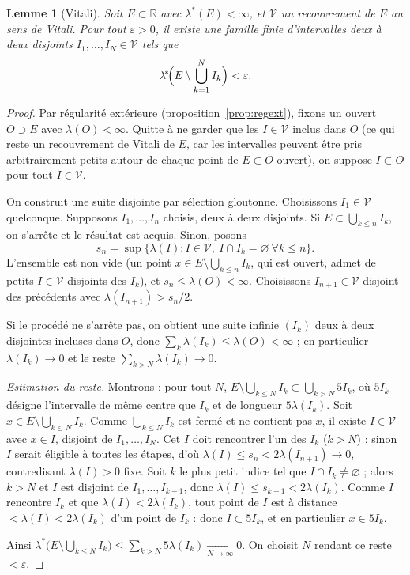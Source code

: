 \documentclass[11pt]{article}
\theoremstyle{thmblue}
\newtheorem{lemme}[theoreme]{Lemme}
\theoremstyle{defplain}
\theoremstyle{rem}
\newcommand{\R}{\mathbb{R}}
\newcommand{\eps}{\varepsilon}
\newcommand{\lstar}{\lambda^{\!*}}
\begin{document}
\begin{lemme}[Vitali]\label{lem:vitali}
Soit $E\subset\R$ avec $\lstar(E)<\infty$, et $\mathcal V$ un recouvrement de $E$ au sens de Vitali.
Pour tout $\eps>0$, il existe une famille \emph{finie} d'intervalles \emph{deux à deux disjoints}
$I_1,\dots,I_N\in\mathcal V$ tels que
\[
\lstar\!\Bigl(E\setminus\bigcup_{k=1}^{N} I_k\Bigr)<\eps.
\]
\end{lemme}

\begin{proof}
Par régularité extérieure (proposition~\ref{prop:regext}), fixons un ouvert $O\supset E$ avec $\lambda(O)<\infty$. Quitte à ne garder
que les $I\in\mathcal V$ inclus dans $O$ (ce qui reste un recouvrement de Vitali de $E$, car les
intervalles peuvent être pris arbitrairement petits autour de chaque point de $E\subset O$ ouvert),
on suppose $I\subset O$ pour tout $I\in\mathcal V$.

On construit une suite disjointe par sélection gloutonne. Choisissons $I_1\in\mathcal V$ quelconque.
Supposons $I_1,\dots,I_n$ choisis, deux à deux disjoints. Si $E\subset\bigcup_{k\le n}I_k$, on
s'arrête et le résultat est acquis. Sinon, posons
\[
s_n=\sup\{\lambda(I):I\in\mathcal V,\ I\cap I_k=\varnothing\ \forall k\le n\}.
\]
L'ensemble est non vide (un point $x\in E\setminus\bigcup_{k\le n}I_k$, qui est ouvert, admet de
petits $I\in\mathcal V$ disjoints des $I_k$), et $s_n\le\lambda(O)<\infty$. Choisissons
$I_{n+1}\in\mathcal V$ disjoint des précédents avec $\lambda(I_{n+1})>s_n/2$.

Si le procédé ne s'arrête pas, on obtient une suite infinie $(I_k)$ deux à deux disjointes incluses
dans $O$, donc $\sum_k\lambda(I_k)\le\lambda(O)<\infty$ ; en particulier $\lambda(I_k)\to0$ et le
reste $\sum_{k>N}\lambda(I_k)\to0$.

\emph{Estimation du reste.} Montrons : pour tout $N$,
$\displaystyle E\setminus\bigcup_{k\le N}I_k\subset\bigcup_{k>N}5I_k$, où $5I_k$ désigne l'intervalle
de même centre que $I_k$ et de longueur $5\lambda(I_k)$. Soit
$x\in E\setminus\bigcup_{k\le N}I_k$. Comme $\bigcup_{k\le N}I_k$ est fermé et ne contient pas $x$,
il existe $I\in\mathcal V$ avec $x\in I$, disjoint de $I_1,\dots,I_N$. Cet $I$ doit rencontrer l'un
des $I_k$ ($k>N$) : sinon $I$ serait éligible à toutes les étapes, d'où
$\lambda(I)\le s_n<2\lambda(I_{n+1})\to0$, contredisant $\lambda(I)>0$ fixe. Soit $k$ le plus petit
indice tel que $I\cap I_k\neq\varnothing$ ; alors $k>N$ et $I$ est disjoint de $I_1,\dots,I_{k-1}$,
donc $\lambda(I)\le s_{k-1}<2\lambda(I_k)$. Comme $I$ rencontre $I_k$ et que
$\lambda(I)<2\lambda(I_k)$, tout point de $I$ est à distance $<\lambda(I)<2\lambda(I_k)$ d'un point de
$I_k$ : donc $I\subset 5I_k$, et en particulier $x\in5I_k$.

Ainsi $\lstar\bigl(E\setminus\bigcup_{k\le N}I_k\bigr)\le\sum_{k>N}5\lambda(I_k)\xrightarrow[N\to\infty]{}0$.
On choisit $N$ rendant ce reste $<\eps$.
\end{proof}
\end{document}
